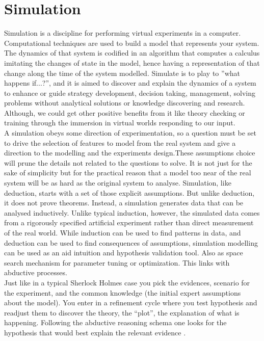 \documentclass[11pt,oneside,a4paper,openright]{report}
\begin{document}
\section{Simulation}
Simulation is a discipline for performing virtual experiments in a computer. Computational techniques are used to build a model that represents your system. The dynamics of that system is codified in an algorithm that computes a calculus imitating the changes of state in the model, hence having a representation of that change along the time of the system modelled. Simulate is to play to ''what happens if...?'', and it is aimed to discover and explain the dynamics of a system to enhance or guide strategy development, decision taking, management, solving problems without analytical solutions or knowledge discovering and research. Although, we could get other positive benefits from it like theory checking or training through the immersion in virtual worlds responding to our input.\\
A simulation obeys some direction of experimentation, so a question must be set to drive the selection of features to model from the real system and give a direction to the modelling and the experiments design.These assumptions choice will prune the details not related to the questions to solve. It is not just for the sake of simplicity but for the practical reason that a model too near of the real system will be as hard as the original system to analyse.
Simulation, like deduction, starts with a set of those explicit assumptions. But unlike deduction, it does not prove theorems. Instead, a simulation generates data that can be analysed inductively. Unlike typical induction, however, the simulated data comes from a rigorously specified artificial experiment rather than direct measurement of the real world. While induction can be used to find patterns in data, and deduction can be used to find consequences of assumptions, simulation modelling can be used as an aid intuition and hypothesis validation tool. Also as space search mechanism for parameter tuning or optimization. This links with abductive processes.\\
Just like in a typical Sherlock Holmes case you pick the evidences, scenario for the experiment, and the common knowledge (the initial expert assumptions about the model). You enter in a refinement cycle where you test hypothesis and readjust them to discover the theory, the ``plot'', the explanation of what is happening. Following the abductive reasoning schema one looks for the hypothesis that would best explain the relevant evidence \cite{Axelrod2003}.\\
\end{document}

